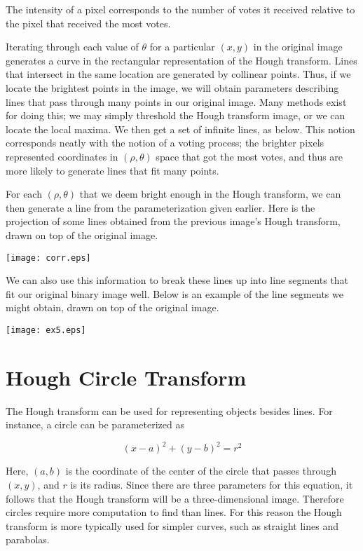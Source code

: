 \documentclass[12pt]{article}
\begin{document}
The intensity of a pixel corresponds to the number of votes it received relative to the pixel that received the most votes.

Iterating through each value of $\theta$ for a particular $(x, y)$ in the original image generates a curve in the rectangular representation of the Hough transform.  Lines that intersect in the same location are generated by collinear points.  Thus, if we locate the brightest points in the image, we will obtain parameters describing lines that pass through many points in our original image.  Many methods exist for doing this; we may simply threshold the Hough transform image, or we can locate the local maxima.  We then get a set of infinite lines, as below.
This notion corresponds neatly with the notion of a voting process; the brighter pixels represented coordinates in $(\rho,\theta)$ space that got the most votes, and thus are more likely to generate lines that fit many points.

For each $(\rho,\theta)$ that we deem bright enough in the Hough transform, we can then generate a line from the parameterization given earlier.  Here is the projection of some lines obtained from the previous image's Hough transform, drawn on top of the original image.

\begin{center}
\texttt{[image: corr.eps]}
\end{center}

We can also use this information to break these lines up into line segments that fit our original binary image well.  Below is an example of the line segments we might obtain, drawn on top of the original image.

\begin{center}
\texttt{[image: ex5.eps]}
\end{center}

\section*{Hough Circle Transform}

The Hough transform can be used for representing objects besides lines.  For instance, a circle can be parameterized as

$$
(x-a)^2+(y-b)^2=r^2
$$

Here, $(a, b)$ is the coordinate of the center of the circle that passes through $(x, y)$, and $r$ is its radius.  Since there are three parameters for this equation, it follows that the Hough transform will be a three-dimensional image.  Therefore circles require more computation to find than lines.  For this reason the Hough transform is more typically used for simpler curves, such as straight lines and parabolas.
\end{document}
